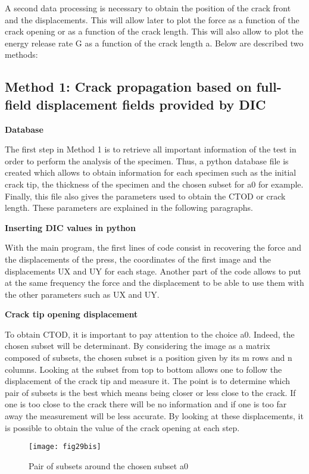A second data processing is necessary to obtain the position of the crack front and the displacements. This will allow later to plot the force as a function of the crack opening or as a function of the crack length. This will also allow to plot the energy release rate G as a function of the crack length a. Below are described two methods:

\subsection{Method 1: Crack propagation based on full-field displacement fields provided by DIC}

\textbf{Database}

The first step in Method 1 is to retrieve all important information of the test in order to perform the analysis of the specimen. Thus, a python database file is created which allows to obtain information for each specimen such as the initial crack tip, the thickness of the specimen and the chosen subset for a0 for example. Finally, this file also gives the parameters used to obtain the CTOD or crack length. These parameters are explained in the following paragraphs.

\textbf{Inserting DIC values in python}

With the main program, the first lines of code consist in recovering the force and the displacements of the press, the coordinates of the first image and the displacements UX and UY for each stage.
Another part of the code allows to put at the same frequency the force and the displacement to be able to use them with the other parameters such as UX and UY.

\textbf{Crack tip opening displacement}

To obtain CTOD, it is important to pay attention to the choice a0. Indeed, the chosen subset will be determinant. By considering the image as a matrix composed of subsets, the chosen subset is a position given by its m rows and n columns. Looking at the subset from top to bottom allows one to follow the displacement of the crack tip and measure it. The point is to determine which pair of subsets is the best which means being closer or less close to the crack. If one is too close to the crack there will be no information and if one is too far away the measurement will be less accurate. By looking at these displacements, it is possible to obtain the value of the crack opening at each step.

\begin{figure}[htp]
	\centering
	\texttt{[image: fig29bis]}
	\caption{Pair of subsets around the chosen subset a0}
	\label{fig:fig29bis}
\end{figure}


